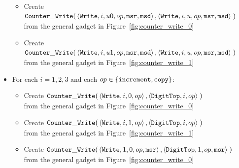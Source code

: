 \begin{itemize}
\begin{itemize}
        \item Create
        $\begin{aligned}[t]
            {\tt Counter\_Write}(& \left\langle {\tt Write}, i, u0, op, {\tt msr}, {\tt msd} \right\rangle,
                       \left\langle {\tt Write}, i, u,  op, {\tt msr}, {\tt msd} \right\rangle \;)
        \end{aligned}$ \\ from the general gadget in Figure~\ref{fig:counter_write_0}

        \item Create
        $\begin{aligned}[t]
            {\tt Counter\_Write}(& \left\langle {\tt Write}, i,  u1, op, {\tt msr}, {\tt msd}\right\rangle,
                       \left\langle {\tt Write}, i,  u,  op, {\tt msr}, {\tt msd}\right\rangle \;)
        \end{aligned}$ \\ from the general gadget in Figure~\ref{fig:counter_write_1}
        \end{itemize}

    \item For each $i = 1,2,3$ and each $op \in \{{\tt increment}, {\tt copy} \}$:
    \begin{itemize}
        \item Create
        $\begin{aligned}[t]
            {\tt Counter\_Write}(& \left\langle {\tt Write},    i, 0, op \right\rangle,
                       \left\langle {\tt DigitTop}, i,    op \right\rangle \;)
        \end{aligned}$ \\ from the general gadget in Figure~\ref{fig:counter_write_0}

        \item Create
        $\begin{aligned}[t]
            {\tt Counter\_Write}(& \left\langle {\tt Write},    i, 1, op \right\rangle,
                       \left\langle {\tt DigitTop}, i,    op \right\rangle \;)
        \end{aligned}$ \\ from the general gadget in Figure~\ref{fig:counter_write_1}

        \item Create
        $\begin{aligned}[t]
            {\tt Counter\_Write}(& \left\langle {\tt Write},    1, 0, op, {\tt msr} \right\rangle,
                       \left\langle {\tt DigitTop}, 1,    op, {\tt msr} \right\rangle \;)
        \end{aligned}$ \\ from the general gadget in Figure~\ref{fig:counter_write_0}


\end{itemize}
\end{itemize}

